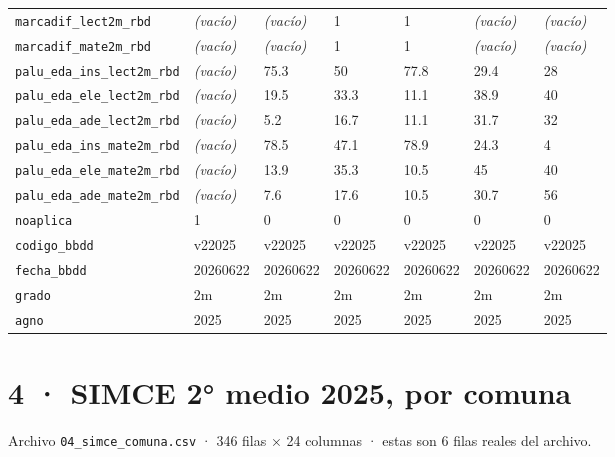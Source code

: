 \documentclass[10pt]{article}
\begin{document}
\begin{xltabular}{\linewidth}{@{}p{4.3cm} Y Y Y Y Y Y @{}}
\texttt{marcadif\_\allowbreak{}lect2m\_\allowbreak{}rbd} & \textit{\color{gris}(vacío)} & \textit{\color{gris}(vacío)} & 1 & 1 & \textit{\color{gris}(vacío)} & \textit{\color{gris}(vacío)} \\
\texttt{marcadif\_\allowbreak{}mate2m\_\allowbreak{}rbd} & \textit{\color{gris}(vacío)} & \textit{\color{gris}(vacío)} & 1 & 1 & \textit{\color{gris}(vacío)} & \textit{\color{gris}(vacío)} \\
\texttt{palu\_\allowbreak{}eda\_\allowbreak{}ins\_\allowbreak{}lect2m\_\allowbreak{}rbd} & \textit{\color{gris}(vacío)} & 75.3 & 50 & 77.8 & 29.4 & 28 \\
\texttt{palu\_\allowbreak{}eda\_\allowbreak{}ele\_\allowbreak{}lect2m\_\allowbreak{}rbd} & \textit{\color{gris}(vacío)} & 19.5 & 33.3 & 11.1 & 38.9 & 40 \\
\texttt{palu\_\allowbreak{}eda\_\allowbreak{}ade\_\allowbreak{}lect2m\_\allowbreak{}rbd} & \textit{\color{gris}(vacío)} & 5.2 & 16.7 & 11.1 & 31.7 & 32 \\
\texttt{palu\_\allowbreak{}eda\_\allowbreak{}ins\_\allowbreak{}mate2m\_\allowbreak{}rbd} & \textit{\color{gris}(vacío)} & 78.5 & 47.1 & 78.9 & 24.3 & 4 \\
\texttt{palu\_\allowbreak{}eda\_\allowbreak{}ele\_\allowbreak{}mate2m\_\allowbreak{}rbd} & \textit{\color{gris}(vacío)} & 13.9 & 35.3 & 10.5 & 45 & 40 \\
\texttt{palu\_\allowbreak{}eda\_\allowbreak{}ade\_\allowbreak{}mate2m\_\allowbreak{}rbd} & \textit{\color{gris}(vacío)} & 7.6 & 17.6 & 10.5 & 30.7 & 56 \\
\texttt{noaplica} & 1 & 0 & 0 & 0 & 0 & 0 \\
\texttt{codigo\_\allowbreak{}bbdd} & v22025 & v22025 & v22025 & v22025 & v22025 & v22025 \\
\texttt{fecha\_\allowbreak{}bbdd} & 20260622 & 20260622 & 20260622 & 20260622 & 20260622 & 20260622 \\
\texttt{grado} & 2m & 2m & 2m & 2m & 2m & 2m \\
\texttt{agno} & 2025 & 2025 & 2025 & 2025 & 2025 & 2025 \\
\end{xltabular}
\normalsize

\clearpage
\hypertarget{base4}{}
\section{4 · SIMCE 2° medio 2025, por comuna}
\small Archivo \texttt{04\_simce\_comuna.csv} · 346 filas × 24 columnas · estas son 6 filas reales del archivo.\normalsize
\end{document}
